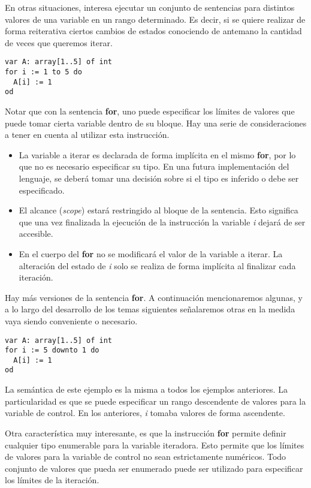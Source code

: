 \documentclass{article}
\begin{document}
En otras situaciones, interesa ejecutar un conjunto de sentencias para distintos valores de una variable en un rango determinado.
Es decir, si se quiere realizar de forma reiterativa ciertos cambios de estados conociendo de antemano la cantidad de veces que queremos iterar.

\begin{lstlisting}
var A: array[1..5] of int
for i := 1 to 5 do
  A[i] := 1
od
\end{lstlisting}

Notar que con la sentencia \textbf{for}, uno puede especificar los límites de valores que puede tomar cierta variable dentro de su bloque.
Hay una serie de consideraciones a tener en cuenta al utilizar esta instrucción.

\begin{itemize}
\item La variable a iterar es declarada de forma implícita en el mismo \textbf{for}, por lo que no es necesario especificar su tipo.
En una futura implementación del lenguaje, se deberá tomar una decisión sobre si el tipo es inferido o debe ser especificado.
\item El alcance (\textit{scope}) estará restringido al bloque de la sentencia.
Esto significa que una vez finalizada la ejecución de la instrucción la variable \textit{i} dejará de ser accesible.
\item En el cuerpo del \textbf{for} no se modificará el valor de la variable a iterar.
La alteración del estado de \textit{i} solo se realiza de forma implícita al finalizar cada iteración.
\end{itemize}

Hay más versiones de la sentencia \textbf{for}.
A continuación mencionaremos algunas, y a lo largo del desarrollo de los temas siguientes señalaremos otras en la medida vaya siendo conveniente o necesario.

\begin{lstlisting}
var A: array[1..5] of int
for i := 5 downto 1 do
  A[i] := 1
od
\end{lstlisting}

La semántica de este ejemplo es la misma a todos los ejemplos anteriores.
La particularidad es que se puede especificar un rango descendente de valores para la variable de control.
En los anteriores, \textit{i} tomaba valores de forma ascendente.

Otra característica muy interesante, es que la instrucción \textbf{for} permite definir cualquier tipo enumerable para la variable iteradora.
Esto permite que los límites de valores para la variable de control no sean estrictamente numéricos.
Todo conjunto de valores que pueda ser enumerado puede ser utilizado para especificar los límites de la iteración.
\end{document}
